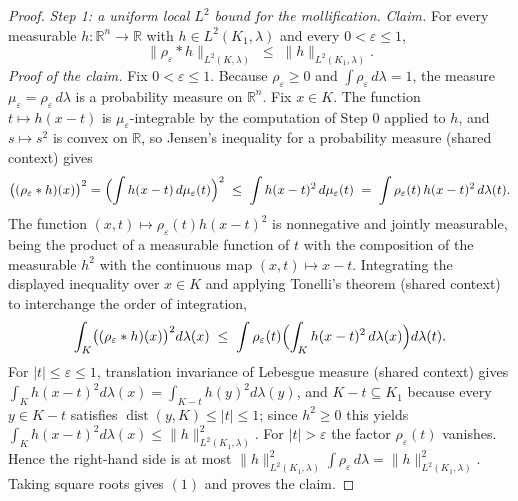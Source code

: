 \begin{proof}
\emph{Step 1: a uniform local $L^2$ bound for the mollification.}
\emph{Claim.}  For every measurable $h : \mathbb{R}^n \to \mathbb{R}$ with
$h \in L^2(K_1,\lambda)$ and every $0 < \varepsilon \leq 1$,
\begin{equation*}
  \|\rho_\varepsilon * h\|_{L^2(K,\lambda)} \;\leq\; \|h\|_{L^2(K_1,\lambda)} .
  \tag{1}
\end{equation*}
\emph{Proof of the claim.}  Fix $0 < \varepsilon \leq 1$.  Because
$\rho_\varepsilon \geq 0$ and $\int \rho_\varepsilon \, d\lambda = 1$, the measure
$\mu_\varepsilon = \rho_\varepsilon\,d\lambda$ is a probability measure on
$\mathbb{R}^n$.  Fix $x \in K$.  The function
$t \mapsto h(x-t)$ is $\mu_\varepsilon$-integrable by the computation of Step 0
applied to $h$, and $s \mapsto s^2$ is convex on $\mathbb{R}$, so Jensen's
inequality for a probability measure (shared context) gives
\[
  \bigl((\rho_\varepsilon * h)(x)\bigr)^2
    = \Bigl(\int h(x-t)\, d\mu_\varepsilon(t)\Bigr)^{2}
    \;\leq\; \int h(x-t)^2 \, d\mu_\varepsilon(t)
    \;=\; \int \rho_\varepsilon(t)\, h(x-t)^2\, d\lambda(t) .
\]
The function $(x,t) \mapsto \rho_\varepsilon(t) h(x-t)^2$ is nonnegative and
jointly measurable, being the product of a measurable function of $t$ with the
composition of the measurable $h^2$ with the continuous map $(x,t)\mapsto x-t$.
Integrating the displayed inequality over $x \in K$ and applying Tonelli's
theorem (shared context) to interchange the order of integration,
\[
  \int_K \bigl((\rho_\varepsilon * h)(x)\bigr)^2 d\lambda(x)
    \;\leq\; \int \rho_\varepsilon(t) \Bigl(\int_K h(x-t)^2\, d\lambda(x)\Bigr) d\lambda(t) .
\]
For $|t| \leq \varepsilon \leq 1$, translation invariance of Lebesgue measure
(shared context) gives
$\int_K h(x-t)^2 d\lambda(x) = \int_{K-t} h(y)^2 d\lambda(y)$, and
$K - t \subseteq K_1$ because every $y \in K-t$ satisfies
$\operatorname{dist}(y,K) \leq |t| \leq 1$; since $h^2 \geq 0$ this yields
$\int_K h(x-t)^2 d\lambda(x) \leq \|h\|_{L^2(K_1,\lambda)}^2$.  For $|t| > \varepsilon$
the factor $\rho_\varepsilon(t)$ vanishes.  Hence the right-hand side is at most
$\|h\|_{L^2(K_1,\lambda)}^2 \int \rho_\varepsilon\, d\lambda = \|h\|_{L^2(K_1,\lambda)}^2$.
Taking square roots gives $(1)$ and proves the claim.


\end{proof}
